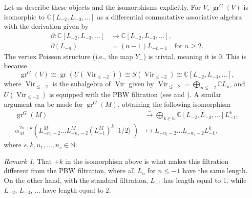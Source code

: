 \documentclass[a4paper, 12pt, reqno]{amsart}
\theoremstyle{remark}
\newtheorem{remark}[theorem]{Remark}
\DeclareMathOperator{\Vir}{Vir}
\DeclareMathOperator{\gr}{gr}
\DeclareMathOperator{\vachalf}{|1/2\rangle}
\begin{document}
Let us describe these objects and the isomorphisms explicitly.
For $V$, $\gr^G(V)$ is isomorphic to $\mathbb{C}[L_{-2}, L_{-3}, \dots]$ as a differential commutative associative algebra with the derivation given by
\begin{align*}
  \partial: \mathbb{C}[L_{-2}, L_{-3}, \dots] &\to \mathbb{C}[L_{-2}, L_{-3}, \dots], \\
  \partial(L_{-n}) &= (n - 1)L_{-n - 1} \quad \text{for $n \ge 2$}.
\end{align*}
The vertex Poisson structure (i.e., the map $Y_-$) is trivial, meaning it is $0$.
This is because
\begin{equation*}
  \gr^G(V) \cong \gr(U(\Vir_{\le -2})) \cong S(\Vir_{\le -2}) \cong \mathbb{C}[L_{-2}, L_{-3}, \dots],
\end{equation*}
where $\Vir_{\le -2}$ is the subalgebra of $\Vir$ given by $\Vir_{\le -2} = \bigoplus_{n \le -2}\mathbb{C}L_n$, and $U(\Vir_{\le -2})$ is equipped with the PBW filtration (see \cite[\S2]{dixmier_enveloping_1996} and \cite[(5.2.25)]{lepowsky_introduction_2004}).
A similar argument can be made for $\gr^G(M)$, obtaining the following isomorphism
\begin{align*}
  \gr^G(M) &\xrightarrow{\sim} \bigoplus_{k \in \mathbb{N}}\mathbb{C}[L_{-2}, L_{-3}, \dots]L_{-1}^k, \\
  \alpha_M^{2s + k}(L_{-n_1 - 2}^M\dots L_{-n_s - 2}^M(L_{-1}^M)^k\vachalf) &\mapsto L_{-n_1 - 2}\dots L_{-n_s - 2}L_{-1}^k,
\end{align*}
where $s, k, n_1, \dots, n_s \in \mathbb{N}$.

\begin{remark}
  \label{rmk:4}
  That $+k$ in the isomorphism above is what makes this filtration different from the PBW filtration, where all $L_n$ for $n \le -1$ have the same length.
  On the other hand, with the standard filtration, $L_{-1}$ has length equal to $1$, while $L_{-2}$, $L_{-3}$, $\dots$ have length equal to $2$.
\end{remark}
\end{document}
